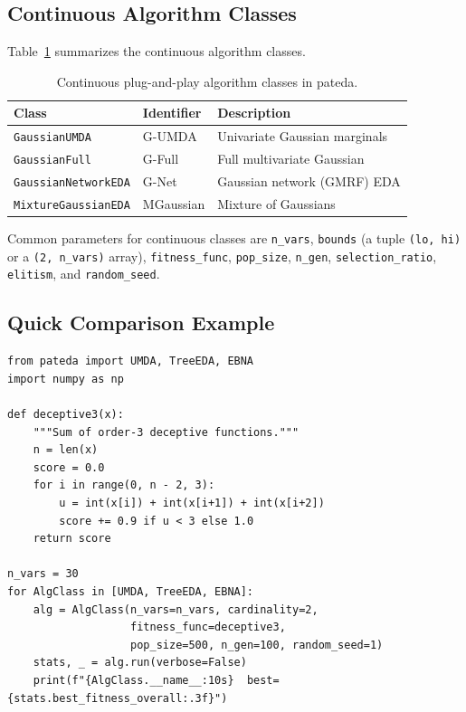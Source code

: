 \documentclass[a4paper,11pt]{article}
\begin{document}
\subsection{Continuous Algorithm Classes}

Table~\ref{tab:continuous_algs} summarizes the continuous algorithm classes.

\begin{table}[ht]
\centering
\small
\setlength{\tabcolsep}{4pt}
\begin{tabular}{llp{7.5cm}}
\toprule
\textbf{Class} & \textbf{Identifier} & \textbf{Description} \\
\midrule
\texttt{GaussianUMDA} & G-UMDA & Univariate Gaussian marginals \citep{Larranhaga_et_al:1999,Larranhaga_et_al:2000} \\
\texttt{GaussianFull}  & G-Full & Full multivariate Gaussian \citep{Larranhaga_et_al:2000,Bosman_and_Thierens:2000} \\
\texttt{GaussianNetworkEDA} & G-Net & Gaussian network (GMRF) EDA \\
\texttt{MixtureGaussianEDA} & MGaussian & Mixture of Gaussians \citep{Bosman_and_Thierens:2002} \\
\bottomrule
\end{tabular}
\caption{Continuous plug-and-play algorithm classes in pateda.}
\label{tab:continuous_algs}
\end{table}

Common parameters for continuous classes are \texttt{n\_vars},
\texttt{bounds} (a tuple \texttt{(lo, hi)} or a \texttt{(2, n\_vars)} array),
\texttt{fitness\_func}, \texttt{pop\_size}, \texttt{n\_gen},
\texttt{selection\_ratio}, \texttt{elitism}, and \texttt{random\_seed}.

\subsection{Quick Comparison Example}

\begin{lstlisting}
from pateda import UMDA, TreeEDA, EBNA
import numpy as np

def deceptive3(x):
    """Sum of order-3 deceptive functions."""
    n = len(x)
    score = 0.0
    for i in range(0, n - 2, 3):
        u = int(x[i]) + int(x[i+1]) + int(x[i+2])
        score += 0.9 if u < 3 else 1.0
    return score

n_vars = 30
for AlgClass in [UMDA, TreeEDA, EBNA]:
    alg = AlgClass(n_vars=n_vars, cardinality=2,
                   fitness_func=deceptive3,
                   pop_size=500, n_gen=100, random_seed=1)
    stats, _ = alg.run(verbose=False)
    print(f"{AlgClass.__name__:10s}  best={stats.best_fitness_overall:.3f}")
\end{lstlisting}
\end{document}
